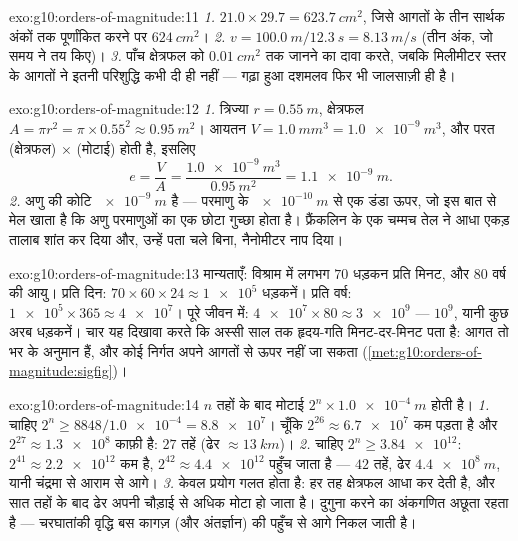 \begin{solution}{exo:g10:orders-of-magnitude:11}
\emph{1.} $21.0 \times 29.7 = \qty{623.7}{cm^2}$, जिसे आगतों के तीन सार्थक अंकों तक पूर्णांकित
करने पर $\qty{624}{cm^2}$।
\emph{2.} $v = \qty{100.0}{m}/\qty{12.3}{s} = \qty{8.13}{m/s}$ (तीन अंक, जो समय ने तय किए)।
\emph{3.} पाँच  क्षेत्रफल को $\qty{0.01}{cm^2}$ तक जानने का दावा
करते, जबकि मिलीमीटर स्तर के आगतों ने इतनी परिशुद्धि कभी दी ही नहीं ---
गढ़ा हुआ दशमलव फिर भी जालसाज़ी ही है।
\end{solution}

\begin{solution}{exo:g10:orders-of-magnitude:12}
\emph{1.} त्रिज्या $r = \qty{0.55}{m}$, क्षेत्रफल $A = \pi r^{2} = \pi \times 0.55^{2} \approx \qty{0.95}{m^2}$। आयतन $V = \qty{1.0}{mm^3} = \qty{1.0e-9}{m^3}$, और परत
(क्षेत्रफल) $\times$ (मोटाई) होती है, इसलिए
\[
e = \frac{V}{A} = \frac{\qty{1.0e-9}{m^3}}{\qty{0.95}{m^2}}
= \qty{1.1e-9}{m} .
\]
\emph{2.} अणु की कोटि $\qty{e-9}{m}$ है --- परमाणु के $\qty{e-10}{m}$ से एक डंडा ऊपर,
जो इस बात से मेल खाता है कि अणु परमाणुओं का एक छोटा गुच्छा होता है।
फ्रैंकलिन के एक चम्मच तेल ने आधा एकड़ तालाब शांत कर दिया और, उन्हें
पता चले बिना, नैनोमीटर नाप दिया।
\end{solution}

\begin{solution}{exo:g10:orders-of-magnitude:13}
मान्यताएँ: विश्राम में लगभग $70$ धड़कन प्रति मिनट, और $80$ वर्ष की
आयु। प्रति दिन: $70 \times 60 \times 24 \approx \num{1e5}$ धड़कनें। प्रति वर्ष: $\num{1e5} \times 365 \approx \num{4e7}$। पूरे जीवन में:
$\num{4e7} \times 80 \approx \num{3e9}$ ---  $10^{9}$, यानी कुछ अरब धड़कनें। चार
 यह दिखावा करते कि अस्सी साल तक हृदय-गति मिनट-दर-मिनट
पता है: आगत तो  भर के अनुमान हैं, और कोई निर्गत अपने आगतों
से ऊपर नहीं जा सकता (\cref{met:g10:orders-of-magnitude:sigfig})।
\end{solution}

\begin{solution}{exo:g10:orders-of-magnitude:14}
$n$ तहों के बाद मोटाई $2^{n} \times \qty{1.0e-4}{m}$ होती है।
\emph{1.} चाहिए $2^{n} \geq 8848/\num{1.0e-4} = \num{8.8e7}$। चूँकि $2^{26} \approx \num{6.7e7}$ कम पड़ता है और $2^{27} \approx \num{1.3e8}$ काफ़ी है:
$27$ तहें (ढेर $\approx \qty{13}{km}$)।
\emph{2.} चाहिए $2^{n} \geq \num{3.84e12}$: $2^{41} \approx
\num{2.2e12}$ कम है, $2^{42} \approx \num{4.4e12}$ पहुँच जाता है ---
$42$ तहें, ढेर $\qty{4.4e8}{m}$, यानी चंद्रमा से आराम से आगे।
\emph{3.} केवल प्रयोग गलत होता है: हर तह क्षेत्रफल आधा कर देती है, और
सात तहों के बाद ढेर अपनी चौड़ाई से अधिक मोटा हो जाता है। दुगुना करने का
अंकगणित अछूता रहता है --- चरघातांकी वृद्धि बस कागज़ (और अंतर्ज्ञान) की
पहुँच से आगे निकल जाती है।
\end{solution}

